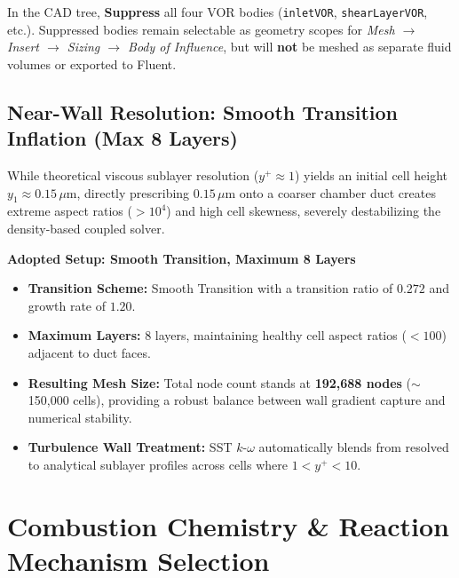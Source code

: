 \documentclass[11pt,a4paper]{article}
\begin{document}
\begin{tcolorbox}[basebox, title={SpaceClaim / Meshing Rule for VORs}]
In the CAD tree, \textbf{Suppress} all four VOR bodies (\texttt{inletVOR}, \texttt{shearLayerVOR}, etc.). Suppressed bodies remain selectable as geometry scopes for \emph{Mesh $\to$ Insert $\to$ Sizing $\to$ Body of Influence}, but will \textbf{not} be meshed as separate fluid volumes or exported to Fluent.
\end{tcolorbox}

\subsection{Near-Wall Resolution: Smooth Transition Inflation (Max 8 Layers)}
While theoretical viscous sublayer resolution ($y^+ \approx 1$) yields an initial cell height $y_1 \approx 0.15\,\mu\text{m}$, directly prescribing $0.15\,\mu\text{m}$ onto a coarser chamber duct creates extreme aspect ratios ($>10^4$) and high cell skewness, severely destabilizing the density-based coupled solver.

\textbf{Adopted Setup: Smooth Transition, Maximum 8 Layers}
\begin{itemize}\setlength\itemsep{0.18em}
    \item \textbf{Transition Scheme:} Smooth Transition with a transition ratio of $0.272$ and growth rate of $1.20$.
    \item \textbf{Maximum Layers:} 8 layers, maintaining healthy cell aspect ratios ($<100$) adjacent to duct faces.
    \item \textbf{Resulting Mesh Size:} Total node count stands at \textbf{192,688 nodes} ($\sim$150,000 cells), providing a robust balance between wall gradient capture and numerical stability.
    \item \textbf{Turbulence Wall Treatment:} SST $k$-$\omega$ automatically blends from resolved to analytical sublayer profiles across cells where $1 < y^+ < 10$.
\end{itemize}

\section{Combustion Chemistry \& Reaction Mechanism Selection}
\end{document}
